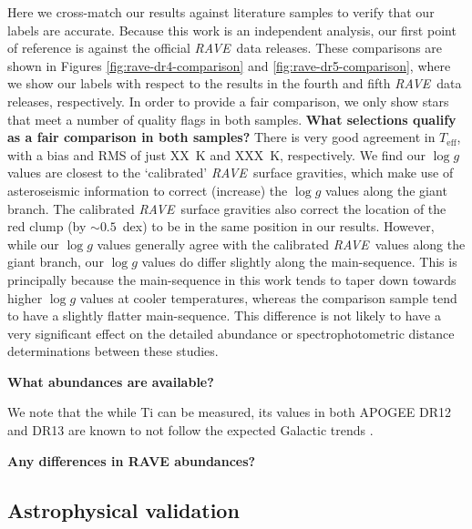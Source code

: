 \documentclass[preprint,trackchanges]{aastex}
\newcommand{\acronym}[1]{{\small{#1}}}
\newcommand{\project}[1]{\textsl{#1}}
\newcommand{\rave}{\project{\acronym{RAVE}}}
\newcommand{\stub}[1]{\textbf{#1}}
\newcommand{\teff}{T_{\mathrm{eff}}}
\newcommand{\logg}{\log g}
\begin{document}
Here we cross-match our results against literature samples to verify that
our labels are accurate.  Because this work is an independent analysis, our
first point of reference is against the official \rave\ data releases.  These
comparisons are shown in Figures \ref{fig:rave-dr4-comparison} and 
\ref{fig:rave-dr5-comparison}, where we show our labels with respect to the
results in the fourth and fifth \rave\ data releases, respectively.  In order
to provide a fair comparison, we only show stars that meet a number of quality
flags in both samples. 
\stub{What selections qualify as a fair comparison in both samples?}
There is very good agreement in $\teff$, with a bias
and RMS of just XX~K and XXX~K, respectively.  We find our $\logg$ values are
closest to the `calibrated' \rave\ surface gravities, which make use of 
asteroseismic information to correct (increase) the $\logg$ values along the
giant branch.  The calibrated \rave\ surface gravities also correct the 
location of the red clump (by $\sim0.5$~dex) to be in the same position in our
results.  However, while our $\logg$ values generally agree with the calibrated
\rave\ values along the giant branch, our $\logg$ values do differ slightly 
along the main-sequence.  This is principally because the main-sequence in 
this work tends to taper down towards higher $\logg$ values at cooler 
temperatures, whereas the comparison sample tend to have a slightly flatter
main-sequence.  This difference is not likely to have a very significant 
effect on the detailed abundance or spectrophotometric distance determinations
between these studies.

\stub{What abundances are available?}

We note that the while Ti can be measured, its values in both 
APOGEE DR12 and DR13 are known to not follow the expected Galactic trends \citep{Holtzman_2015, Hawkins_2016}.

\stub{Any differences in RAVE abundances?}



\subsection{Astrophysical validation}
\end{document}
